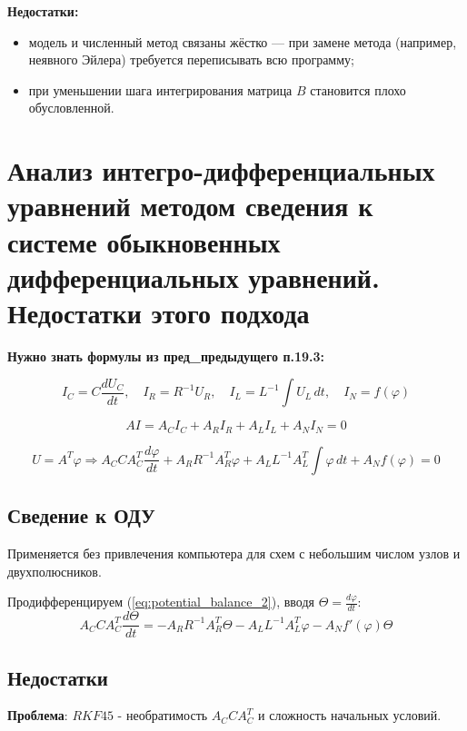 	\textbf{Недостатки:}
	\begin{itemize}
		\item модель и численный метод связаны жёстко — при замене метода (например, неявного Эйлера) требуется переписывать всю программу;
		\item при уменьшении шага интегрирования матрица \( B \) становится плохо обусловленной.
	\end{itemize}
	
	\newpage
	
	\section{Анализ интегро-дифференциальных уравнений методом сведения к системе обыкновенных дифференциальных уравнений. Недостатки этого подхода}
	
	\textbf{Нужно знать формулы из пред\_предыдущего п.19.3:}
	
	\begin{equation}
		I_C = C \frac{dU_C}{dt}, \quad
		I_R = R^{-1} U_R, \quad
		I_L = L^{-1} \int U_L \, dt, \quad
		I_N = f(\varphi)
	\end{equation}
	
	\begin{equation}
		A I = A_C I_C + A_R I_R + A_L I_L + A_N I_N = 0
		\label{eq:ai_decomposition_2}
	\end{equation}
	
	\begin{equation}
		U = A^T \varphi \Rightarrow
		A_C C A_C^T \frac{d\varphi}{dt} + 
		A_R R^{-1} A_R^T \varphi + 
		A_L L^{-1} A_L^T \int \varphi \, dt + 
		A_N f(\varphi) = 0
		\label{eq:potential_balance_2}
	\end{equation}
	
	\subsection{Сведение к ОДУ}
	Применяется без привлечения компьютера для схем с небольшим числом 
	узлов и двухполюсников.
	\par
	Продифференцируем (\ref{eq:potential_balance_2}), вводя $\Theta = \frac{d \varphi}{dt}$:
	\begin{equation}
		A_C C A_C^T \frac{d \Theta}{dt} = -A_R R^{-1} A_R^T \Theta - A_L L^{-1} A_L^T \varphi - A_N f'(\varphi) \Theta
	\end{equation}
	\subsection{Недостатки} 
	\textbf{Проблема}: {\color{red} } $RKF45$ - необратимость $A_C C A_C^T$ и сложность начальных условий.
	
